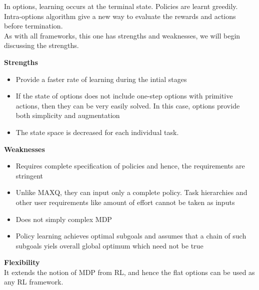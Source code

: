 In options, learning occurs at the terminal state. Policies are learnt greedily. Intra-options algorithm give a new way to evaluate the rewards and actions before termination. \\

As with all frameworks, this one has strengths and weaknesses, we will begin discussing the strengths.

\textbf{Strengths}
\begin{itemize}
    \item Provide a faster rate of learning during the intial stages
    \item If the state of options does not include one-step options with primitive actions, then they can be very easily solved. In this case, options provide both simplicity and augmentation
    \item The state space is decreased for each individual task.
\end{itemize}

\textbf{Weaknesses}
\begin{itemize}
    \item Requires complete specification of policies and hence, the requirements are stringent
    \item Unlike MAXQ, they can input only a complete policy. Task hierarchies and other user requirements like amount of effort cannot be taken as inputs
    \item Does not simply complex MDP
    \item Policy learning achieves optimal subgoals and assumes that a chain of such subgoals yiels overall global optimum which need not be true
\end{itemize}

\textbf{Flexibility} \\
It extends the notion of MDP from RL, and hence the flat options can be used as any RL framework. 

